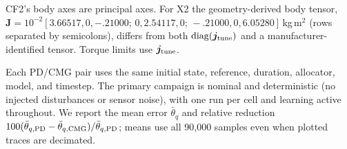 \documentclass[letterpaper, 10 pt, conference]{ieeeconf}
\begin{document}

CF2's body axes are principal axes. For X2 the geometry-derived body tensor,
$\bm J=10^{-2}[3.66517,0,-.21000;\allowbreak\,0,2.54117,0;\allowbreak\,-.21000,0,6.05280]$\,kg\,m$^2$
(rows separated by semicolons), differs from both $\operatorname{diag}(\bm j_{\rm tune})$ and a
manufacturer-identified tensor. Torque limits use $\bm j_{\rm tune}$.

Each PD/CMG pair uses the same initial state, reference, duration, allocator, model, and timestep. The primary campaign is nominal and deterministic (no injected disturbances or sensor noise), with one run per cell and learning active throughout. We report the mean error $\bar\theta_q$ and relative reduction $100(\bar\theta_{q,\rm PD}-\bar\theta_{q,\rm CMG})/\bar\theta_{q,\rm PD}$; means use all 90{,}000 samples even when plotted traces are decimated.
\end{document}
